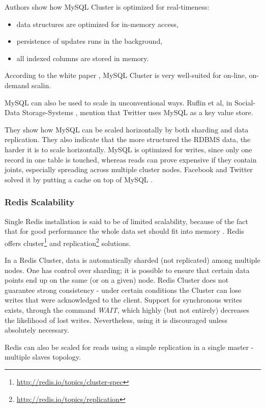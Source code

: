 \documentclass{uvamscse}
\begin{document}
Authors show how MySQL Cluster is optimized for real-timeness:
\begin{itemize}
  \item data structures are optimized for in-memory access,
  \item persistence of updates runs in the background,
  \item all indexed columns are stored in memory.
\end{itemize}
According to the white paper \cite{MySQL}, MySQL Cluster is very well-suited for on-line, on-demand scalin.

MySQL can also be used to scale in unconventional ways. Ruflin et al, in Social-Data Storage-Systems \cite{SoDaSS}, mention that Twitter uses MySQL as a key value store.

They show how MySQL can be scaled horizontally by both sharding and data replication. They also indicate that the more structured the RDBMS data, the harder it is to scale horizontally. MySQL is optimized for writes, since only one record in one table is touched, whereas reads can prove expensive if they contain joints, especially spreading across multiple cluster nodes. Facebook and Twitter solved it by putting a cache on top of MySQL \cite{SoDaSS}.

\subsubsection{Redis Scalability}
Single Redis installation is said to be of limited scalability, because of the fact that for good performance the whole data set should fit into memory \cite{SoDaSS}. Redis offers cluster\footnote{\url{http://redis.io/topics/cluster-spec}} and replication\footnote{\url{http://redis.io/topics/replication}} solutions.

In a Redis Cluster, data is automatically sharded (not replicated) among multiple nodes. One has control over sharding; it is possible to ensure that certain data points end up on the same (or on a given) node. Redis Cluster does not guarantee strong consistency - under certain conditions the Cluster can lose writes that were acknowledged to the client. Support for synchronous writes exists, through the command \textit{WAIT}, which highly (but not entirely) decreases the likelihood of lost writes. Nevertheless, using it is discouraged unless absolutely necessary.

Redis can also be scaled for reads using a simple replication in a single master - multiple slaves topology.
\end{document}
